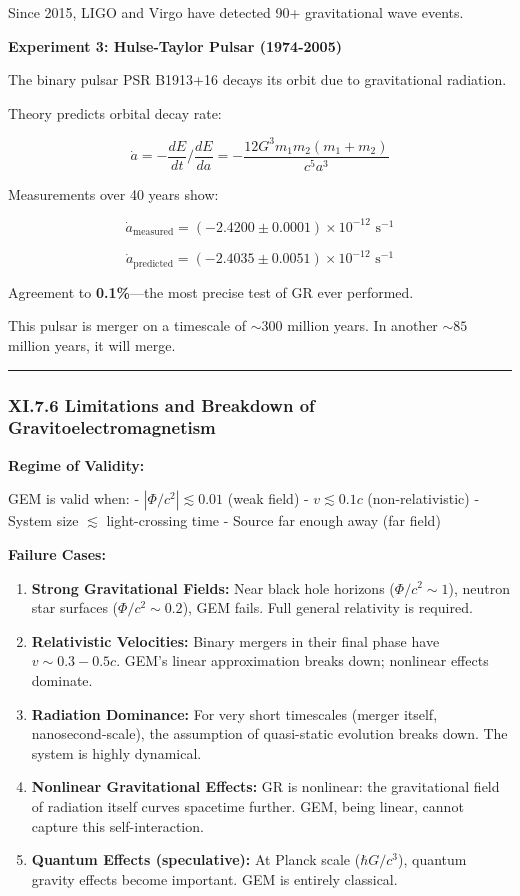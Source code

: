 \documentclass[
]{article}
\begin{document}
Since 2015, LIGO and Virgo have detected 90+ gravitational wave events.

\textbf{Experiment 3: Hulse-Taylor Pulsar (1974-2005)}

The binary pulsar PSR B1913+16 decays its orbit due to gravitational
radiation.

Theory predicts orbital decay rate:

\[\dot{a} = -\frac{dE}{dt} / \frac{dE}{da} = -\frac{12 G^3 m_1 m_2 (m_1 + m_2)}{c^5 a^3}\]

Measurements over 40 years show:

\[\dot{a}_{\text{measured}} = (-2.4200 \pm 0.0001) \times 10^{-12} \text{ s}^{-1}\]

\[\dot{a}_{\text{predicted}} = (-2.4035 \pm 0.0051) \times 10^{-12} \text{ s}^{-1}\]

Agreement to \textbf{0.1\%}---the most precise test of GR ever
performed.

This pulsar is merger on a timescale of \(\sim 300\) million years. In
another \(\sim 85\) million years, it will merge.

\begin{center}\rule{0.5\linewidth}{0.5pt}\end{center}

\subsubsection{XI.7.6 Limitations and Breakdown of
Gravitoelectromagnetism}\label{xi.7.6-limitations-and-breakdown-of-gravitoelectromagnetism}

\textbf{Regime of Validity:}

GEM is valid when: - \(|\Phi/c^2| \lesssim 0.01\) (weak field) -
\(v \lesssim 0.1 c\) (non-relativistic) - System size \(\lesssim\)
light-crossing time - Source far enough away (far field)

\textbf{Failure Cases:}

\begin{enumerate}
\def\labelenumi{\arabic{enumi}.}
\item
  \textbf{Strong Gravitational Fields:} Near black hole horizons
  (\(\Phi/c^2 \sim 1\)), neutron star surfaces (\(\Phi/c^2 \sim 0.2\)),
  GEM fails. Full general relativity is required.
\item
  \textbf{Relativistic Velocities:} Binary mergers in their final phase
  have \(v \sim 0.3-0.5 c\). GEM's linear approximation breaks down;
  nonlinear effects dominate.
\item
  \textbf{Radiation Dominance:} For very short timescales (merger
  itself, nanosecond-scale), the assumption of quasi-static evolution
  breaks down. The system is highly dynamical.
\item
  \textbf{Nonlinear Gravitational Effects:} GR is nonlinear: the
  gravitational field of radiation itself curves spacetime further. GEM,
  being linear, cannot capture this self-interaction.
\item
  \textbf{Quantum Effects (speculative):} At Planck scale
  (\(\hbar G / c^3\)), quantum gravity effects become important. GEM is
  entirely classical.
\end{enumerate}
\end{document}
